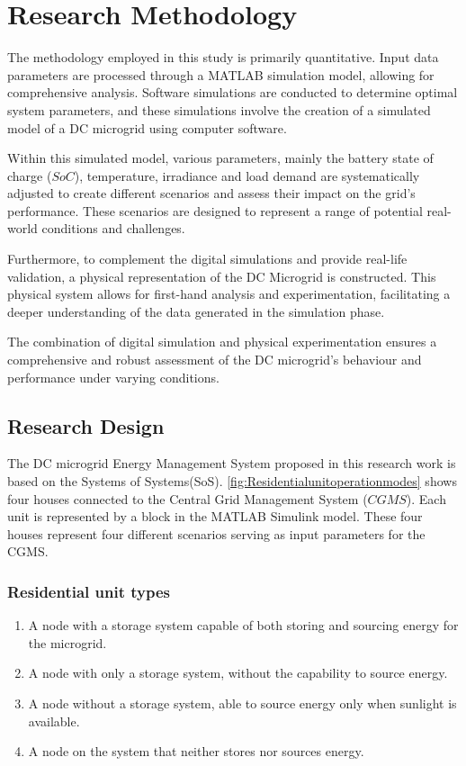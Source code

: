 \section{Research Methodology}
The methodology employed in this study is primarily quantitative. Input data parameters are processed through a MATLAB simulation model, allowing for comprehensive analysis. Software simulations are conducted to determine optimal system parameters, and these simulations involve the creation of a simulated model of a DC microgrid using computer software.\par
Within this simulated model, various parameters, mainly the battery state of charge ($SoC$), temperature, irradiance and load demand are systematically adjusted to create different scenarios and assess their impact on the grid's performance. These scenarios are designed to represent a range of potential real-world conditions and challenges.\par
Furthermore, to complement the digital simulations and provide real-life validation, a physical representation of the DC Microgrid is constructed. This physical system allows for first-hand analysis and experimentation, facilitating a deeper understanding of the data generated in the simulation phase.\par
The combination of digital simulation and physical experimentation ensures a comprehensive and robust assessment of the DC microgrid's behaviour and performance under varying conditions.
\subsection{Research Design}
The DC microgrid Energy Management System proposed in this research work is based on the Systems of Systems(SoS). \autoref{fig:Residentialunitoperationmodes} shows four houses connected to the Central Grid Management System ($CGMS$). Each unit is represented by a block in the MATLAB Simulink model. These four houses represent four different scenarios serving as input parameters for the CGMS.
\subsubsection{Residential unit types}
\begin{enumerate}[nolistsep]
	\item A node with a storage system capable of both storing and sourcing energy for the microgrid.
	\item A node with only a storage system, without the capability to source energy.
	\item A node without a storage system, able to source energy only when sunlight is available.
	\item A node on the system that neither stores nor sources energy.
\end{enumerate}

